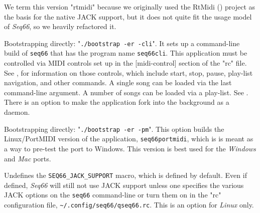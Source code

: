         We term this version "rtmidi" because we originally
        used the RtMidi (\cite{rtmidi}) project as the basis for the native
        JACK support, but it does not quite fit the usage model
        of \textsl{Seq66}, so we heavily refactored it.

        Bootstrapping directly:
        "\texttt{./bootstrap -er -cli}".
        It sets up a command-line build of \texttt{seq66} that has the
        program name \texttt{seq66cli}.
        This application must be controlled via MIDI controls set up in the
        [midi-control] section of the "rc" file.
        See , for
        information on those controls, which include start, stop,
        pause, play-list navigation, and other commands.
        A single song can be loaded via the last command-line argument.
        A number of songs can be loaded via a play-list.
        See .
        There is an option to make
        the application fork into the background as a daemon.
%

        Bootstrapping directly:
        "\texttt{./bootstrap -er -pm}".
        This option builds the Linux/PortMIDI version of the application,
        \texttt{seq66portmidi},
        which is is meant as a way to pre-test the
        port to Windows.
        This version is best used for the \textsl{Windows} and
        \textsl{Mac} ports.


        Undefines the \texttt{SEQ66\_JACK\_SUPPORT} macro, which is
        defined by default.  Even if defined,
        \textsl{Seq66} will still not use JACK support unless
        one specifies the various JACK options on the \texttt{seq66}
        command-line or turn them on in the "rc" configuration file,
        \texttt{\textasciitilde/.config/seq66/qseq66.rc}.
        This is an option for \textsl{Linux} only.

